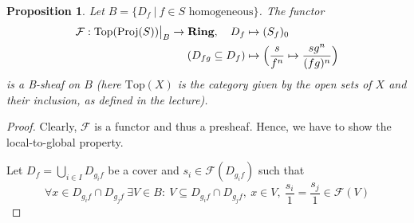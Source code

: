 \documentclass{scrartcl}
\newcommand{\Ring}{\mathrm{\textbf{Ring}}}
\newcommand{\Top}{\mathrm{Top}}
\newcommand{\Proj}{\mathrm{Proj}}
\newcommand\restr[2]{{
    \left.\kern-\nulldelimiterspace
    #1
    \vphantom{\big|}
    \right|_{#2}
}}
\newtheorem{prop}{Proposition}
\theoremstyle{definition}
\begin{document}
\begin{prop}
    Let $B = \{ D_f \ | \ \text{$f \in S$ homogeneous}\}$.
    The functor
    \begin{align*}
        \mathcal{F}: \restr{\Top(\Proj(S))}{B} \to \Ring, \quad D_f &\mapsto (S_f)_0 \\
        (D_{fg} \subseteq D_f) &\mapsto \Bigl( \frac s {f^n} \mapsto \frac {sg^n} {(fg)^n} \Bigr)
    \end{align*}
    is a B-sheaf on $B$ (here $\Top(X)$ is the category given by the open sets of $X$ and their inclusion, as defined in the lecture).
\end{prop}
\begin{proof}
    Clearly, $\mathcal{F}$ is a functor and thus a presheaf.
    Hence, we have to show the local-to-global property.

    Let $D_f = \bigcup_{i \in I} D_{g_if}$ be a cover and $s_i \in \mathcal{F}(D_{g_if})$ such that
    \begin{equation*}
        \forall x \in D_{g_if} \cap D_{g_jf} \ \exists V \in B: \ V \subseteq D_{g_if} \cap D_{g_jf}, \ x \in V, \ \frac {s_i} 1 = \frac {s_j} 1 \in \mathcal{F}(V)
    \end{equation*}
\end{proof}

\printbibliography
\end{document}
